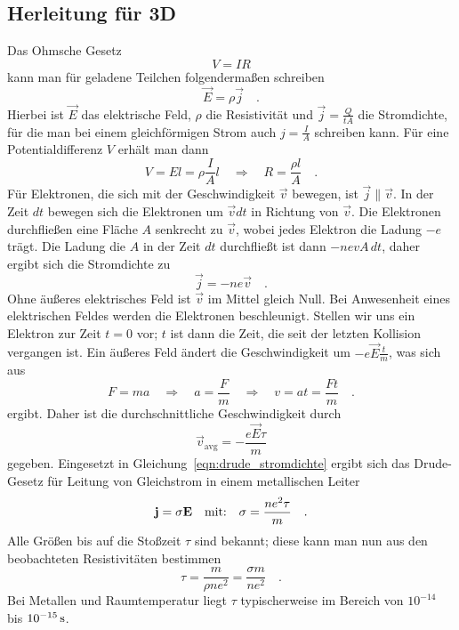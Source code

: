 \documentclass[pointlessnumbers,headsepline,twoside,11pt,DIV14,BCOR15mm,halfparskip,a4paper,appendixprefix]{scrreprt}
\begin{document}
\subsection{Herleitung für 3D}
Das Ohmsche Gesetz
    \begin{equation}
        V = I R
    \end{equation}
kann man für geladene Teilchen folgendermaßen schreiben
    \begin{equation}
        \vec E = \rho \vec j\quad.
    \end{equation}
Hierbei ist $\vec E$ das elektrische Feld, $\rho$ die Resistivität und
$\vec j=\frac{Q}{tA}$ die Stromdichte, für die man bei einem gleichförmigen Strom auch $j = \frac{I}{A}$ schreiben kann. Für eine Potentialdifferenz $V$ erhält man dann
    \begin{equation}
        V = E l = \rho \frac{I}{A} l\quad\Rightarrow\quad R = \frac{\rho l}{A}\quad.
    \end{equation}
Für Elektronen, die sich mit der Geschwindigkeit $\vec v$ bewegen, ist $\vec j\parallel\vec v$. In der Zeit $dt$ bewegen sich die Elektronen um $\vec v dt$ in Richtung von $\vec v$. Die Elektronen durchfließen eine Fläche $A$ senkrecht zu $\vec v$, wobei jedes Elektron die Ladung $-e$ trägt. Die Ladung die $A$ in der Zeit $dt$ durchfließt ist dann $-n e v A\,dt$, daher ergibt sich die Stromdichte zu
    \begin{equation}
        \label{eqn:drude_stromdichte}
        \vec j = - n e \vec v\quad.
    \end{equation}
Ohne äußeres elektrisches Feld ist $\vec v$ im Mittel gleich Null. Bei Anwesenheit eines elektrischen Feldes werden die Elektronen beschleunigt. Stellen wir uns ein Elektron zur Zeit $t=0$ vor; $t$ ist dann die Zeit, die seit der letzten Kollision vergangen ist. Ein äußeres Feld ändert die Geschwindigkeit um $-e\vec E\frac{t}{m}$, was sich aus
    \begin{equation}
        F=ma\quad\Rightarrow\quad a=\frac{F}{m}\quad\Rightarrow\quad v=at=\frac{Ft}{m}\quad.
    \end{equation}
ergibt. Daher ist die durchschnittliche Geschwindigkeit durch
    \begin{equation}
        \vec v_\text{avg}=-\frac{e\vec E\tau}{m}
    \end{equation}
gegeben. Eingesetzt in Gleichung~\eqref{eqn:drude_stromdichte} ergibt sich das Drude-Gesetz für Leitung von Gleichstrom in einem metallischen Leiter
	\begin{equation}
	\bold j = \sigma\bold E\quad\text{mit:}\quad\sigma=\frac{ne^2\tau}{m}\quad.
	\end{equation}
Alle Größen bis auf die Stoßzeit $\tau$ sind bekannt; diese kann man nun aus den beobachteten Resistivitäten bestimmen
	\begin{equation}
	\tau=\frac{m}{\rho ne^2}=\frac{\sigma m}{ne^2}\quad.
	\end{equation}
Bei Metallen und Raumtemperatur liegt $\tau$ typischerweise im Bereich von $10^{-14}$ bis $\unit[10^{-15}]{s}$.
\end{document}
